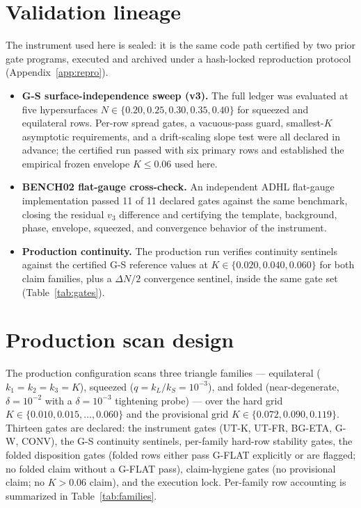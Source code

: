 \documentclass[11pt]{article}
\begin{document}
\section{Validation lineage}
\label{sec:lineage}
The instrument used here is sealed: it is the same code path certified by two prior gate programs,
executed and archived under a hash-locked reproduction protocol (Appendix~\ref{app:repro}).
\begin{itemize}
\item \textbf{G-S surface-independence sweep (v3).} The full ledger was evaluated at five
      hypersurfaces $N \in \{0.20, 0.25, 0.30, 0.35, 0.40\}$ for squeezed and equilateral rows.
      Per-row spread gates, a vacuous-pass guard, smallest-$K$ asymptotic requirements, and a
      drift-scaling slope test were all declared in advance; the certified run passed with six
      primary rows and established the empirical frozen envelope $K \leq 0.06$ used here.
\item \textbf{BENCH02 flat-gauge cross-check.} An independent ADHL flat-gauge implementation passed
      11 of 11 declared gates against the same benchmark, closing the residual $v_3$ difference and
      certifying the template, background, phase, envelope, squeezed, and convergence behavior of
      the instrument.
\item \textbf{Production continuity.} The production run verifies continuity sentinels against the
      certified G-S reference values at $K \in \{0.020, 0.040, 0.060\}$ for both claim families,
      plus a $\Delta N/2$ convergence sentinel, inside the same gate set
      (Table~\ref{tab:gates}).
\end{itemize}

\section{Production scan design}
\label{sec:production}
The production configuration scans three triangle families --- equilateral
($k_1 = k_2 = k_3 = K$), squeezed ($q = k_L/k_S = 10^{-3}$), and folded
(near-degenerate, $\delta = 10^{-2}$ with a $\delta = 10^{-3}$ tightening probe) --- over the hard
grid $K \in \{0.010, 0.015, \ldots, 0.060\}$ and the provisional grid
$K \in \{0.072, 0.090, 0.119\}$. Thirteen gates are declared: the instrument gates (UT-K, UT-FR,
BG-ETA, G-W, CONV), the G-S continuity sentinels, per-family hard-row stability gates, the folded
disposition gates (folded rows either pass G-FLAT explicitly or are flagged; no folded claim
without a G-FLAT pass), claim-hygiene gates (no provisional claim; no $K > 0.06$ claim), and the
execution lock. Per-family row accounting is summarized in Table~\ref{tab:families}.
\end{document}
